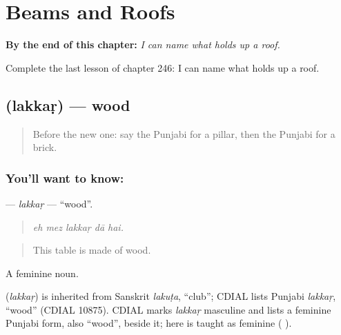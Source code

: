 
\chapter{Beams and Roofs}
\label{ch:pa-a2-beams-and-roofs}

\begin{chapteropening}
\textbf{By the end of this chapter:} \emph{I can name what holds up a roof.}

Complete the last lesson of chapter 246: I can name what holds up a roof.
\end{chapteropening}

\section[\texorpdfstring{\pa{ਲੱਕੜ} (lakkaṛ)}{ਲੱਕੜ (lakkaṛ)}]{ (lakkaṛ) — wood}

\label{lesson:PA-C246-lakkar}



\begin{quote}
Before the new one: say the Punjabi for a pillar, then the Punjabi for a brick.
\end{quote}

\subsection*{You'll want to know: }
\textbf{} — \emph{lakkaṛ} — \textquotedblleft{}wood\textquotedblright{}.

\begin{quote}
    
\end{quote}

\begin{quote}
\emph{eh mez lakkaṛ dā hai.}
\end{quote}

\begin{quote}
This table is made of wood.
\end{quote}

A feminine noun.

\begin{cousinweb}
\textbf{} (\emph{lakkaṛ}) is inherited from Sanskrit \emph{lakuṭa}, \textquotedblleft{}club\textquotedblright{}; CDIAL lists Punjabi \emph{lakkaṛ}, \textquotedblleft{}wood\textquotedblright{} (CDIAL 10875). CDIAL marks \emph{lakkaṛ} masculine and lists a feminine Punjabi form, also \textquotedblleft{}wood\textquotedblright{}, beside it; here  is taught as feminine ( ).
\end{cousinweb}

